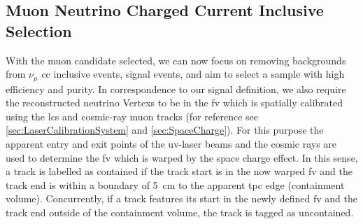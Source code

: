 \subsection{Muon Neutrino Charged Current Inclusive Selection} \label{sec:NewNuMuCCSelection}
With the muon candidate selected, we can now focus on removing backgrounds from $\nu_{\mu}$ \gls{cc} inclusive events, \ie signal events, and aim to select a sample with high efficiency and purity. In correspondence to our signal definition, we also require the reconstructed neutrino \glspl{Vertex} to be in the \gls{fv} which is spatially calibrated using the \gls{lcs} and cosmic-ray muon tracks (for reference see \ref{sec:LaserCalibrationSystem} and \ref{sec:SpaceCharge}). For this purpose the apparent entry and exit points of the \gls{uv}-laser beams and the cosmic rays are used to determine the \gls{fv} which is warped by the space charge effect. In this sense, a track is labelled as contained if the track start is in the now warped \gls{fv} and the track end is within a boundary of \SI{5}{\centi\metre} to the apparent \gls{tpc} edge (containment volume). Concurrently, if a track features its start in the newly defined \gls{fv} and the track end outside of the containment volume, the track is tagged as uncontained. 

